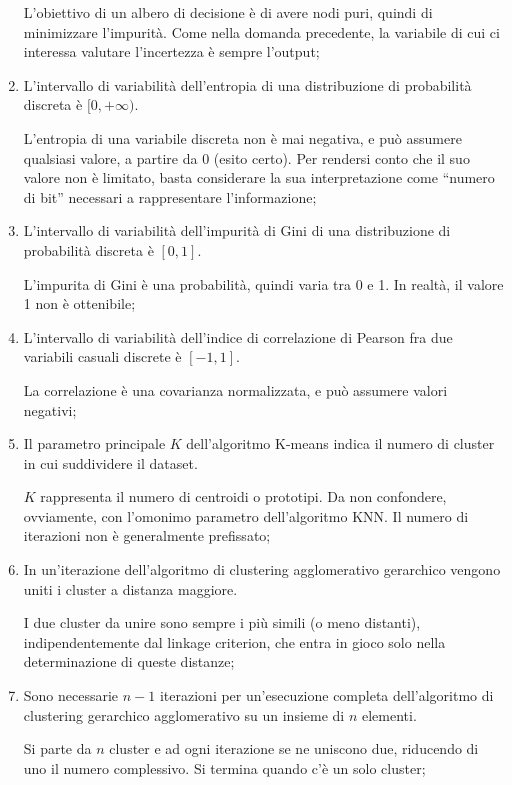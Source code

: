 \begin{enumerate}
	L'obiettivo di un albero di decisione è di avere nodi puri, quindi di minimizzare l'impurità. Come nella domanda precedente, la variabile di cui ci interessa valutare l'incertezza è sempre l'output;

	\item L'intervallo di variabilità dell'entropia di una distribuzione di probabilità discreta è \( [0, +\infty) \).

	L'entropia di una variabile discreta non è mai negativa, e può assumere qualsiasi valore, a partire da 0 (esito certo). %
	Per rendersi conto che il suo valore non è limitato, basta considerare la sua interpretazione come “numero di bit” necessari a rappresentare l'informazione;

	\item L'intervallo di variabilità dell'impurità di Gini di una distribuzione di probabilità discreta è \( [0, 1] \).

	L'impurita di Gini è una probabilità, quindi varia tra 0 e 1. In realtà, il valore 1 non è ottenibile;

	\item L'intervallo di variabilità dell'indice di correlazione di Pearson fra due variabili casuali discrete è \( [-1, 1] \).

	La correlazione è una covarianza normalizzata, e può assumere valori negativi;

	\item Il parametro principale \( K \) dell'algoritmo K-means indica il numero di cluster in cui suddividere il dataset.

	\( K \) rappresenta il numero di centroidi o prototipi. %
	Da non confondere, ovviamente, con l'omonimo parametro dell'algoritmo KNN. Il numero di iterazioni non è generalmente prefissato;

	\item In un'iterazione dell'algoritmo di clustering agglomerativo gerarchico vengono uniti i cluster a distanza maggiore.

	I due cluster da unire sono sempre i più simili (o meno distanti), indipendentemente dal linkage criterion, che entra in gioco solo nella determinazione di queste distanze;

	\item Sono necessarie \( n - 1 \) iterazioni per un'esecuzione completa dell'algoritmo di clustering gerarchico agglomerativo su un insieme di \( n \) elementi.

	Si parte da \( n \) cluster e ad ogni iterazione se ne uniscono due, riducendo di uno il numero complessivo. %
	Si termina quando c'è un solo cluster;


\end{enumerate}
